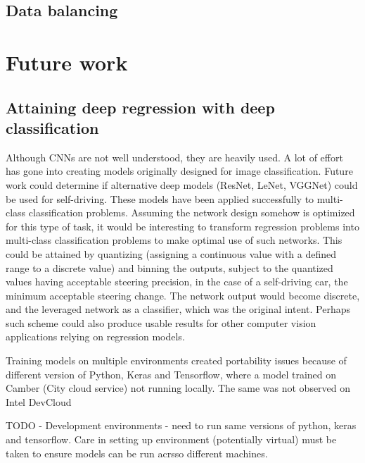 \subsection{Data balancing}

\section{Future work}
\subsection{Attaining deep regression with deep classification}
Although CNNs are not well understood, they are heavily used. A lot of effort has gone into creating models originally designed for image classification. Future work could determine if alternative deep models (ResNet, LeNet, VGGNet) could be used for self-driving. These models have been applied successfully to multi-class classification problems. Assuming the network design somehow is optimized for this type of task, it would be interesting to transform regression problems into multi-class classification problems to make optimal use of such networks. This could be attained by quantizing (assigning a continuous value with a defined range to a discrete value) and binning the outputs, subject to the quantized values having acceptable steering precision, in the case of a self-driving car, the minimum acceptable steering change. The network output would become discrete, and the leveraged network as a classifier, which was the original intent. Perhaps such scheme could also produce usable results for other computer vision applications relying on regression models.

Training models on multiple environments created portability issues because of different version of Python, Keras and Tensorflow, where a model trained on Camber (City cloud service) not running locally. The same was not observed on Intel DevCloud 

TODO - Development environments - need to run same versions of python, keras and tensorflow. Care in setting up environment (potentially virtual) must be taken to ensure models can be run acrsso different machines.
